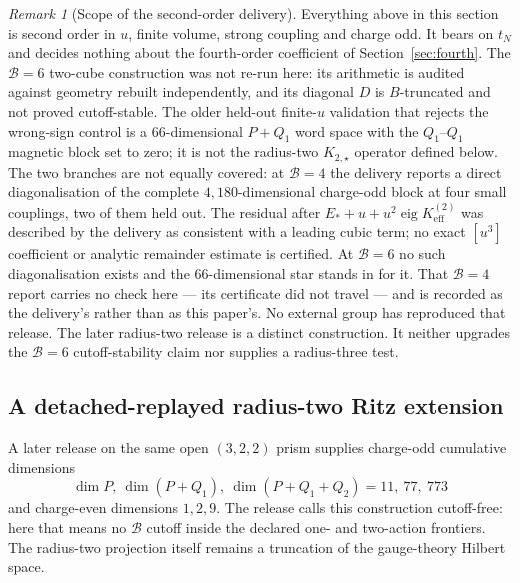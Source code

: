 \documentclass[11pt]{article}
\theoremstyle{plain}
\theoremstyle{definition}
\theoremstyle{remark}
\newtheorem{remark}[theorem]{Remark}
\begin{document}
\begin{remark}[Scope of the second-order delivery]
Everything above in this section is second order in $u$, finite volume,
strong coupling and charge odd. It bears on $t_N$ and decides nothing about the
fourth-order coefficient of Section~\ref{sec:fourth}. The
$\mathcal B=6$ two-cube construction was not re-run here: its arithmetic is
audited against geometry rebuilt independently, and its diagonal $D$ is
$B$-truncated and not proved cutoff-stable. The older held-out finite-$u$
validation that rejects the wrong-sign control is a $66$-dimensional $P+Q_1$
word space with the $Q_1$--$Q_1$ magnetic block set to zero; it is not the
radius-two $K_{2,\star}$ operator defined below. The two branches are not equally
covered: at $\mathcal B=4$ the delivery reports a direct diagonalisation of
the complete $4{,}180$-dimensional charge-odd block at four small couplings,
two of them held out.  The residual after
$E_*+u+u^2\operatorname{eig}K_{\mathrm{eff}}^{(2)}$ was described by the
delivery as consistent with a leading cubic term; no exact $[u^3]$
coefficient or analytic remainder estimate is certified. At $\mathcal B=6$
no such diagonalisation exists and the $66$-dimensional star stands in for
it. That $\mathcal B=4$ report carries no check here --- its certificate
did not travel --- and is recorded as the delivery's rather than as this
paper's. No external group has reproduced that release. The later radius-two
release is a distinct construction. It neither upgrades the $\mathcal B=6$
cutoff-stability claim nor supplies a radius-three test.
\end{remark}

\subsection{A detached-replayed radius-two Ritz extension}
\label{subsec:radius2}

A later release on the same open $(3,2,2)$ prism supplies charge-odd
cumulative dimensions
\[
  \dim P,\ \dim(P+Q_1),\ \dim(P+Q_1+Q_2)=11,\ 77,\ 773
\]
and charge-even dimensions $1,2,9$. The release calls this construction
cutoff-free: here that means no $\mathcal B$ cutoff inside the declared one-
and two-action frontiers. The radius-two projection itself remains a
truncation of the gauge-theory Hilbert space.
\end{document}

